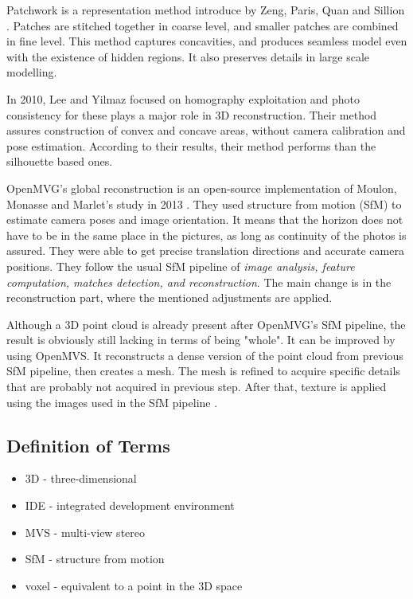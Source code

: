 \documentclass[journal]{./IEEE/IEEEtran}
\begin{document}
Patchwork is a representation method introduce by Zeng, Paris, Quan and Sillion \cite{ZengParisQuanSillion}. Patches are stitched together in coarse level, and smaller patches are combined in fine level. This method captures concavities, and produces seamless model even with the existence of hidden regions. It also preserves details in large scale modelling.

In 2010, Lee and Yilmaz \cite{LeeYilmaz} focused on homography exploitation and photo consistency for these plays a major role in 3D reconstruction. Their method assures construction of convex and concave areas, without camera calibration and pose estimation. According to their results, their method performs than the silhouette based ones.

OpenMVG's global reconstruction is an open-source implementation of  Moulon, Monasse and Marlet's study in 2013 \cite{MoulonMonasseMarlet}. They used structure from motion (SfM) to estimate camera poses and image orientation. It means that the horizon does not have to be in the same place in the pictures, as long as continuity of the photos is assured. They were able to get precise translation directions and accurate camera positions. They follow the usual SfM pipeline of \textit{image analysis, feature computation, matches detection, and reconstruction}. The main change is in the reconstruction part, where the mentioned adjustments are applied.

Although a 3D point cloud is already present after OpenMVG's SfM pipeline, the result is obviously still lacking in terms of being "whole". It can be improved by using OpenMVS. It reconstructs a dense version of the point cloud from previous SfM pipeline, then creates a mesh. The mesh is refined to acquire specific details that are probably not acquired in previous step. After that, texture is applied using the images used in the SfM pipeline \cite{OpenMVS}.

\subsection{Definition of Terms}
\begin{itemize}
    \item 3D - three-dimensional
    \item IDE - integrated development environment
    \item MVS - multi-view stereo
    \item SfM - structure from motion
    \item voxel -  equivalent to a point in the 3D space
\end{itemize}
\end{document}
